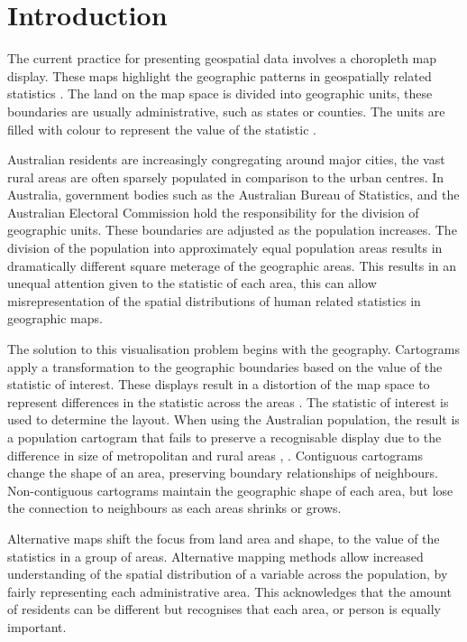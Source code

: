 \documentclass[
]{jss}
\author{
Stephanie Kobakian\\Queensland University of Technology \And Dianne Cook\\Monash University
}
\title{}
\begin{document}
\hypertarget{introduction}{%
\section{Introduction}\label{introduction}}

The current practice for presenting geospatial data involves a
choropleth map display. These maps highlight the geographic patterns in
geospatially related statistics \citep{SAMGIS}. The land on the map
space is divided into geographic units, these boundaries are usually
administrative, such as states or counties. The units are filled with
colour to represent the value of the statistic \citep{EI}.

Australian residents are increasingly congregating around major cities,
the vast rural areas are often sparsely populated in comparison to the
urban centres. In Australia, government bodies such as the Australian
Bureau of Statistics, and the Australian Electoral Commission hold the
responsibility for the division of geographic units. These boundaries
are adjusted as the population increases. The division of the population
into approximately equal population areas results in dramatically
different square meterage of the geographic areas. This results in an
unequal attention given to the statistic of each area, this can allow
misrepresentation of the spatial distributions of human related
statistics in geographic maps.

The solution to this visualisation problem begins with the geography.
Cartograms apply a transformation to the geographic boundaries based on
the value of the statistic of interest. These displays result in a
distortion of the map space to represent differences in the statistic
across the areas \citep{ACCAC}. The statistic of interest is used to
determine the layout. When using the Australian population, the result
is a population cartogram that fails to preserve a recognisable display
due to the difference in size of metropolitan and rural areas
\citep{ACTUC}, \citep{GOINO}. Contiguous cartograms change the shape of
an area, preserving boundary relationships of neighbours. Non-contiguous
cartograms maintain the geographic shape of each area, but lose the
connection to neighbours as each areas shrinks or grows.

Alternative maps shift the focus from land area and shape, to the value
of the statistics in a group of areas. Alternative mapping methods allow
increased understanding of the spatial distribution of a variable across
the population, by fairly representing each administrative area. This
acknowledges that the amount of residents can be different but
recognises that each area, or person is equally important.
\end{document}
